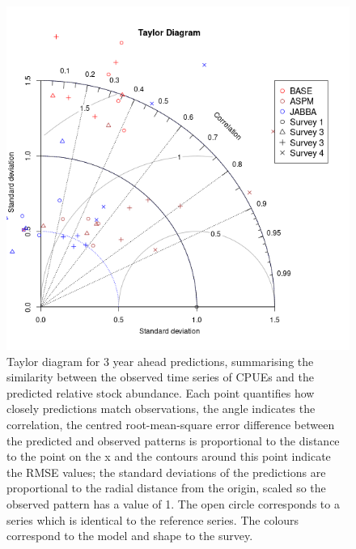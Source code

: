 \documentclass[a4paper]{article}
\begin{document}
\begin{figure}[htbp]
\centering
\includegraphics[width=6in]{final-taylor-hy-1.png}
\caption{Taylor diagram for 3 year ahead predictions, summarising the similarity between the observed time series of CPUEs and the predicted relative stock abundance. Each point quantifies how closely predictions match observations, the angle indicates the correlation, the centred root-mean-square error difference between the predicted and observed patterns is proportional to the distance to the point on the x and the contours around this point indicate the RMSE values; the standard deviations of the predictions are proportional to the radial distance from the origin, scaled so the observed pattern has a value of 1. The open circle corresponds to a series which is identical to the reference series. The colours correspond to the model and shape to the survey.}
\label{fig:tdhat}
\end{figure}
\end{document}
